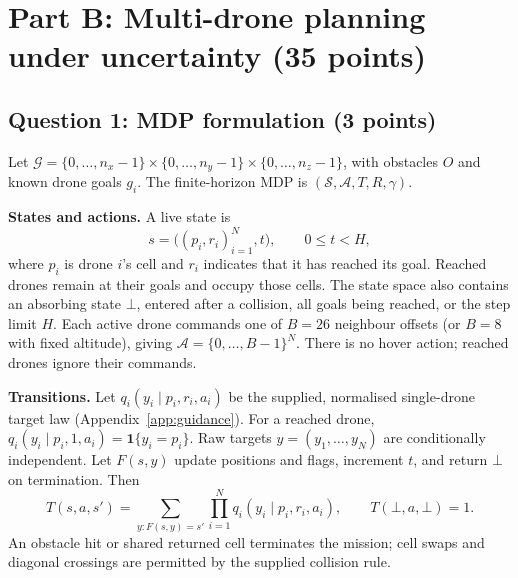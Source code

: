 














\section*{Part B: Multi-drone planning under uncertainty (35 points)}
\begingroup
\setlength{\parindent}{0pt}
\setlength{\parskip}{4pt}

\subsection*{Question 1: MDP formulation (3 points)}
Let $\mathcal G=\{0,\ldots,n_x-1\}\times\{0,\ldots,n_y-1\}
\times\{0,\ldots,n_z-1\}$, with obstacles $O$ and known drone goals $g_i$.
The finite-horizon MDP is $(\mathcal S,\mathcal A,T,R,\gamma)$.

\textbf{States and actions.} A live state is
\[
 s=\bigl((p_i,r_i)_{i=1}^{N},t\bigr),\qquad 0\le t<H,
\]
where $p_i$ is drone $i$'s cell and $r_i$ indicates that it has reached its
goal. Reached drones remain at their goals and occupy those cells.
The state space also contains an absorbing state $\bot$, entered after a
collision, all goals being reached, or the step limit $H$.
Each active drone commands one of $B=26$ neighbour offsets (or $B=8$ with
fixed altitude), giving $\mathcal A=\{0,\ldots,B-1\}^{N}$.
There is no hover action; reached drones ignore their commands.

\textbf{Transitions.} Let $q_i(y_i\mid p_i,r_i,a_i)$ be the supplied,
normalised single-drone target law (Appendix~\ref{app:guidance}).
For a reached drone, $q_i(y_i\mid p_i,1,a_i)=\mathbf1\{y_i=p_i\}$.
Raw targets $y=(y_1,\ldots,y_N)$ are conditionally independent.
Let $F(s,y)$ update positions and flags, increment $t$, and return $\bot$
on termination. Then
\[
 T(s,a,s')=\sum_{y:F(s,y)=s'}\prod_{i=1}^{N}
 q_i(y_i\mid p_i,r_i,a_i),\qquad T(\bot,a,\bot)=1.
\]
An obstacle hit or shared returned cell terminates the mission; cell swaps
and diagonal crossings are permitted by the supplied collision rule.

